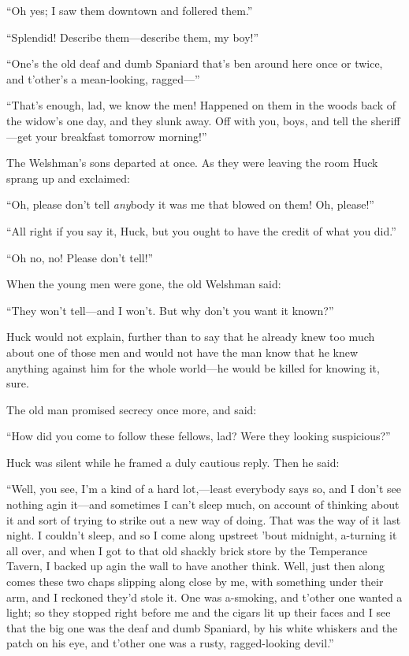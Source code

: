 \documentclass{book}
\begin{document}
“Oh yes; I saw them downtown and follered them.”

“Splendid! Describe them—describe them, my boy!”

“One’s the old deaf and dumb Spaniard that’s ben around here once or twice, and t’other’s a mean-looking, ragged—”

“That’s enough, lad, we know the men! Happened on them in the woods back of the widow’s one day, and they slunk away. Off with you, boys, and tell the sheriff—get your breakfast tomorrow morning!”

The Welshman’s sons departed at once. As they were leaving the room Huck sprang up and exclaimed:

“Oh, please don’t tell \emph{any}body it was me that blowed on them! Oh, please!”

“All right if you say it, Huck, but you ought to have the credit of what you did.”

“Oh no, no! Please don’t tell!”

When the young men were gone, the old Welshman said:

“They won’t tell—and I won’t. But why don’t you want it known?”

Huck would not explain, further than to say that he already knew too much about one of those men and would not have the man know that he knew anything against him for the whole world—he would be killed for knowing it, sure.

The old man promised secrecy once more, and said:

“How did you come to follow these fellows, lad? Were they looking suspicious?”

Huck was silent while he framed a duly cautious reply. Then he said:

“Well, you see, I’m a kind of a hard lot,—least everybody says so, and I don’t see nothing agin it—and sometimes I can’t sleep much, on account of thinking about it and sort of trying to strike out a new way of doing. That was the way of it last night. I couldn’t sleep, and so I come along upstreet ’bout midnight, a-turning it all over, and when I got to that old shackly brick store by the Temperance Tavern, I backed up agin the wall to have another think. Well, just then along comes these two chaps slipping along close by me, with something under their arm, and I reckoned they’d stole it. One was a-smoking, and t’other one wanted a light; so they stopped right before me and the cigars lit up their faces and I see that the big one was the deaf and dumb Spaniard, by his white whiskers and the patch on his eye, and t’other one was a rusty, ragged-looking devil.”
\end{document}
